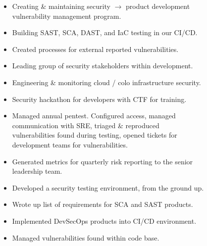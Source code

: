 \documentclass[10pt,a4paper,ragged2e]{rohrbach}
\begin{document}
\begin{paracol}{2}

\begin{itemize}
  \item Creating \& maintaining security $\rightarrow$ product development\\ vulnerability management program.
  \item Building SAST, SCA, DAST, and IaC testing in our CI/CD.
  \item Created processes for external reported vulnerabilities.
  \item Leading group of security stakeholders within development.
  \item Engineering \& monitoring cloud / colo infrastructure security.
  \item Security hackathon for developers with CTF for training.
  \item Managed annual pentest. Configured access, managed \\communication with SRE, triaged \& reproduced \\vulnerabilities found during testing, opened tickets for \\development teams for vulnerabilities.
  \item Generated metrics for quarterly risk reporting to the senior \\leadership team.
\end{itemize}

\divider

\begin{itemize}
  \item Developed a security testing environment, from the ground up.
  \item Wrote up list of requirements for SCA and SAST products.
  \item Implemented DevSecOps products into CI/CD environment.
  \item Managed vulnerabilities found within code base.
\end{itemize}

\divider


\end{paracol}
\end{document}
